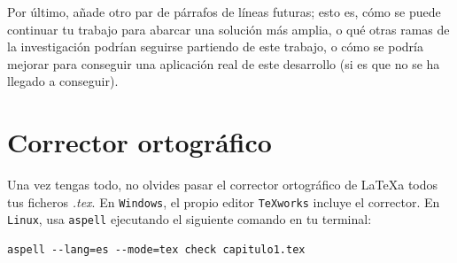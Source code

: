 Por último, añade otro par de párrafos de líneas futuras; esto es, cómo se puede continuar tu trabajo para abarcar una solución más amplia, o qué otras ramas de la investigación podrían seguirse partiendo de este trabajo, o cómo se podría mejorar para conseguir una aplicación real de este desarrollo (si es que no se ha llegado a conseguir).

\section{Corrector ortográfico}

Una vez tengas todo, no olvides pasar el corrector ortográfico de \LaTeX a todos tus ficheros \textit{.tex}. En \texttt{Windows}, el propio editor \texttt{TeXworks} incluye el corrector. En \texttt{Linux}, usa \texttt{aspell} ejecutando el siguiente comando en tu terminal:

\begin{verbatim}
aspell --lang=es --mode=tex check capitulo1.tex
\end{verbatim}
